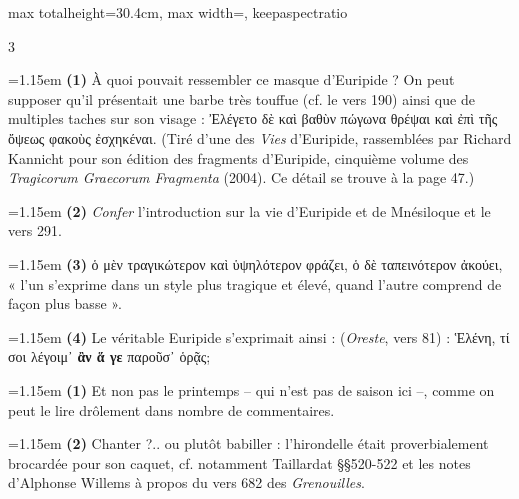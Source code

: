 \documentclass[11pt,twoside]{book}
\newcommand{\italique}[1]{\textit{#1}}
\begin{document}
\begin{adjustbox}{max totalheight=30.4cm, max width=\textwidth, keepaspectratio}
\begin{minipage}{\textwidth}
{\begin{multicols}{3}
\par\vspace{1.5pt}
\par\vspace{1.2pt}\par\nopagebreak\vspace{1pt}\noindent\hangindent=1.15em {\color{sepiaNote}\textbf{(1)}} À quoi pouvait ressembler ce masque d'Euripide ? On peut supposer qu'il présentait une barbe très touffue (cf. le vers 190) ainsi que de multiples taches sur son visage : Ἐλέγετο δὲ καὶ βαθὺν πώγωνα θρέψαι καὶ ἐπὶ τῆς ὄψεως φακοὺς ἐσχηκέναι. (Tiré d'une des \italique{Vies} d'Euripide, rassemblées par Richard Kannicht pour son édition des fragments d'Euripide, cinquième volume des \italique{Tragicorum Graecorum Fragmenta} (2004). Ce détail se trouve à la page 47.)
\par\vspace{1.5pt}
\noindent\hangindent=1.15em {\color{sepiaNote}\textbf{(2)}} \italique{Confer} l'introduction sur la vie d'Euripide et de Mnésiloque et le vers 291.
\par\vspace{1.5pt}
\noindent\hangindent=1.15em {\color{sepiaNote}\textbf{(3)}} ὁ μὲν τραγικώτερον καὶ ὑψηλότερον φράζει, ὁ δὲ ταπεινότερον ἀκούει, « l'un s'exprime dans un style plus tragique et élevé, quand l'autre comprend de façon plus basse ».
\par\vspace{1.5pt}
\noindent\hangindent=1.15em {\color{sepiaNote}\textbf{(4)}} Le véritable Euripide s'exprimait ainsi : (\italique{Oreste}, vers 81) : Ἑλένη, τί σοι λέγοιμ᾽ \textbf{ἂν ἅ γε} παροῦσ᾽ ὁρᾷς;
\par\vspace{1.5pt}
\noindent\hangindent=1.15em {\color{sepiaNote}\textbf{(1)}} Et non pas le printemps -- qui n'est pas de saison ici --, comme on peut le lire drôlement dans nombre de commentaires.
\par\vspace{1.5pt}
\noindent\hangindent=1.15em {\color{sepiaNote}\textbf{(2)}} Chanter ?.. ou plutôt babiller : l'hirondelle était proverbialement brocardée pour son caquet, cf. notamment Taillardat §§520-522 et les notes d'Alphonse Willems à propos du vers 682 des \italique{Grenouilles}.
\par\vspace{1.5pt}

\end{multicols}}
\end{minipage}
\end{adjustbox}
\end{document}

